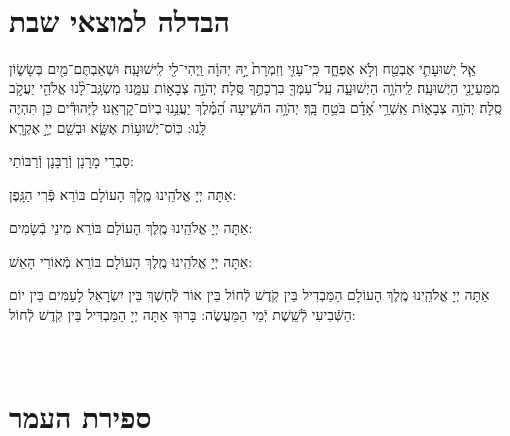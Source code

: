 \documentclass[twoside, openany, parskip=half, 11pt]{book}
\begin{document}
\vfill


 \\


\section[הבדלה]{ הבדלה למוצאי שבת } \label{havdala}

אֵ֧ל יְשׁוּעָתִ֛י אֶבְטַ֖ח וְלֹ֣א אֶפְחָ֑ד כִּֽי־עָזִּ֤י וְזִמְרָת֙ יָ֣הּ יְהוָ֔ה וַֽיְהִי־לִ֖י לִֽישׁוּעָֽה׃
וּשְׁאַבְתֶּם־מַ֖יִם בְּשָׂשׂ֑וֹן מִמַּעַיְנֵ֖י הַיְשׁוּעָֽה׃
לַֽיהֹוָ֥ה הַיְשׁוּעָ֑ה עַֽל־עַמְּךָ֖ בִרְכָתֶ֣ךָ סֶּֽלָה׃ 
יְהֹוָ֣ה צְבָא֣וֹת עִמָּ֑נוּ מִשְׂגָּֽב־לָ֨נוּ אֱלֹהֵ֖י יַעֲקֹ֣ב סֶֽלָה׃
יְהֹוָ֥ה צְבָא֑וֹת אַֽשְׁרֵ֥י אָ֝דָ֗ם בֹּטֵ֥חַ בָּֽךְ׃
יְהֹוָ֥ה הוֹשִׁ֑יעָה הַ֝מֶּ֗לֶךְ יַעֲנֵ֥נוּ בְיוֹם־קׇרְאֵֽנוּ׃
לַיְּהוּדִ֕ים  כֵּן תִּהְיֶה לָּֽנוּ: כּֽוֹס־יְשׁוּע֥וֹת אֶשָּׂ֑א וּבְשֵׁ֖ם יְיָ֣ אֶקְרָֽא׃

\begin{scriptsize}
	סַבְרֵי מָרָנָן וְֿרַבָּנָן וְֿרַבּוֹתַי: \\
\end{scriptsize}
אַתָּה יְיָ אֱלֹהֵֽינוּ מֶֽלֶךְ הָעוֹלָם בּוֹרֵא פְּֿרִי הַגָּֽפֶן:

אַתָּה יְיָ אֱלֹהֵֽינוּ מֶֽלֶךְ הָעוֹלָם בּוֹרֵא מִינֵי בְֿשָׂמִים:

אַתָּה יְיָ אֱלֹהֵֽינוּ מֶֽלֶךְ הָעוֹלָם בּוֹרֵא מְֿאוֹרֵי הָאֵשׁ:

אַתָּה יְיָ אֱלֹהֵֽינוּ מֶֽלֶךְ הָעוֹלָם הַמַּבְדִיל בֵּין קֹֽדֶשׁ לְֿחוֹל בֵּין אוֹר לְֿחֽשֶׁךְ בֵּין יִשְׂרָאֵל לָעַמִּים בֵּין יוֹם הַשְּֿׁבִיעִי לְֿשֵֽׁשֶׁת יְֿמֵי הַמַּעֲשֶׂה: בָּרוּךְ אַתָּה יְיָ הַמַּבְדִּיל בֵּין קֹֽדֶשׁ לְֿחוֹל:
\clearpage

\vspace{-1.3\baselineskip}










\quad{}\quad{}\\

\section{ספירת העמר}
\label{sefiras haomer}
\end{document}
